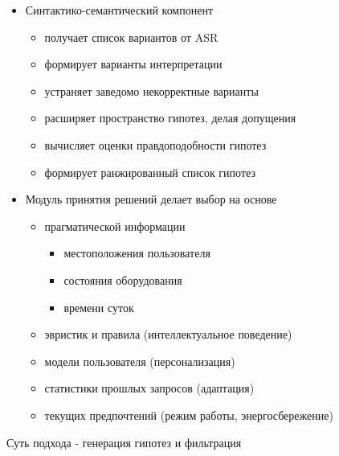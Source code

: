\documentclass[a4paper,12pt]{article}
\begin{document}
\begin{itemize}
	\item Синтактико-семантический компонент
		\begin{itemize}
			\item получает список вариантов от ASR
			\item формирует варианты интерпретации
			\item устраняет заведомо некорректные варианты
			\item расширяет пространство гипотез, делая допущения
			\item вычисляет оценки правдоподобности гипотез
			\item формирует ранжированный список гипотез
		\end{itemize}
	\item Модуль принятия решений делает выбор на основе 
		\begin{itemize}
			\item прагматической информации
				\begin{itemize}
					\item местоположения пользователя
					\item состояния оборудования
					\item времени суток
				\end{itemize}
			\item эвристик и правила (интеллектуальное поведение)
			\item модели пользователя (персонализация) 
			\item статистики прошлых запросов (адаптация)
			\item текущих предпочтений (режим работы, энергосбережение)
		\end{itemize}
\end{itemize}		


Суть подхода - генерация гипотез и фильтрация\\

\end{document}
